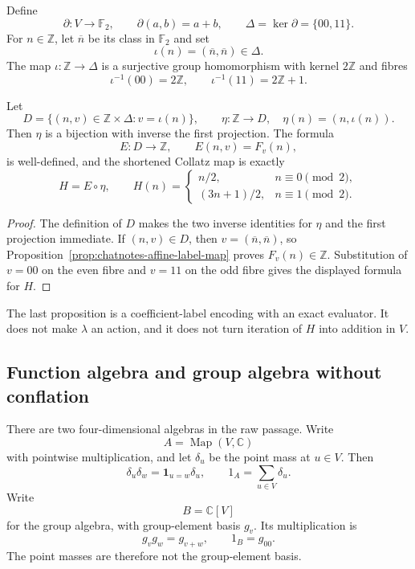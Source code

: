 Define
\[
 \partial:V\longrightarrow\mathbb F_2,
 \qquad \partial(a,b)=a+b,
 \qquad
 \Delta=\ker\partial=\{00,11\}.
\]
For $n\in\mathbb Z$, let $\overline n$ be its class in $\mathbb F_2$ and set
\[
 \iota(n)=(\overline n,\overline n)\in\Delta.
\]
The map $\iota:\mathbb Z\to\Delta$ is a surjective group homomorphism with
kernel $2\mathbb Z$ and fibres
\[
 \iota^{-1}(00)=2\mathbb Z,
 \qquad
 \iota^{-1}(11)=2\mathbb Z+1.
\]

\begin{proposition}
\label{prop:chatnotes-diagonal-evaluator}
Let
\[
 D=\{(n,v)\in\mathbb Z\times\Delta:v=\iota(n)\},
 \qquad
 \eta:\mathbb Z\longrightarrow D,
 \quad \eta(n)=(n,\iota(n)).
\]
Then $\eta$ is a bijection with inverse the first projection.  The formula
\[
 E:D\longrightarrow\mathbb Z,
 \qquad E(n,v)=F_v(n),
\]
is well-defined, and the shortened Collatz map is exactly
\[
 H=E\circ\eta,
 \qquad
 H(n)=
 \begin{cases}
 n/2,&n\equiv0\pmod2,\\
 (3n+1)/2,&n\equiv1\pmod2.
 \end{cases}
\]
\end{proposition}

\begin{proof}
The definition of $D$ makes the two inverse identities for $\eta$ and the
first projection immediate.  If $(n,v)\in D$, then
$v=(\overline n,\overline n)$, so Proposition~\ref{prop:chatnotes-affine-label-map}
proves $F_v(n)\in\mathbb Z$.  Substitution of $v=00$ on the even fibre and
$v=11$ on the odd fibre gives the displayed formula for $H$.
\end{proof}

The last proposition is a coefficient-label encoding with an exact evaluator.
It does not make $\lambda$ an action, and it does not turn iteration of $H$
into addition in $V$.

\subsection{Function algebra and group algebra without conflation}

There are two four-dimensional algebras in the raw passage.  Write
\[
 A=\operatorname{Map}(V,\mathbb C)
\]
with pointwise multiplication, and let $\delta_u$ be the point mass at
$u\in V$.  Then
\[
 \delta_u\delta_w=\mathbf 1_{u=w}\delta_u,
 \qquad
 1_A=\sum_{u\in V}\delta_u.
\]
Write
\[
 B=\mathbb C[V]
\]
for the group algebra, with group-element basis $g_v$.  Its multiplication is
\[
 g_vg_w=g_{v+w},
 \qquad 1_B=g_{00}.
\]
The point masses are therefore not the group-element basis.

